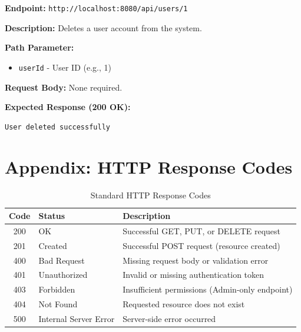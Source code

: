 \documentclass[12pt, a4paper]{article}
\begin{document}
\begin{tcolorbox}[colback=deletecolor!10, colframe=deletecolor, title=DELETE]
\textbf{Endpoint:} \texttt{http://localhost:8080/api/users/1}
\end{tcolorbox}

\textbf{Description:} Deletes a user account from the system.

\textbf{Path Parameter:}
\begin{itemize}
    \item \texttt{userId} - User ID (e.g., 1)
\end{itemize}

\textbf{Request Body:} None required.

\textbf{Expected Response (200 OK):}
\begin{lstlisting}
User deleted successfully
\end{lstlisting}

\newpage

\section{Appendix: HTTP Response Codes}

\begin{table}[H]
\centering
\caption{Standard HTTP Response Codes}
\begin{tabular}{|c|l|p{8cm}|}
\hline
\textbf{Code} & \textbf{Status} & \textbf{Description} \\
\hline
200 & OK & Successful GET, PUT, or DELETE request \\
\hline
201 & Created & Successful POST request (resource created) \\
\hline
400 & Bad Request & Missing request body or validation error \\
\hline
401 & Unauthorized & Invalid or missing authentication token \\
\hline
403 & Forbidden & Insufficient permissions (Admin-only endpoint) \\
\hline
404 & Not Found & Requested resource does not exist \\
\hline
500 & Internal Server Error & Server-side error occurred \\
\hline
\end{tabular}
\end{table}

\end{document}
